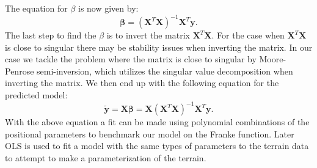 \documentclass[%
 reprint,
nofootinbib,
 amsmath,amssymb,
 aps,
]{revtex4-2}
\begin{document}
%
The equation for $\beta$ is now given by:
%
\begin{equation}\label{eq:beta}
    \boldsymbol{\beta} = (\boldsymbol{X}^{T}\boldsymbol{X})^{-1}\boldsymbol{X}^{T}\boldsymbol{y}.
\end{equation}
%
The last step to find the $\beta$ is to invert the matrix $\boldsymbol{X}^T\boldsymbol{X}$. For the case when $\boldsymbol{X}^T\boldsymbol{X}$ is close to singular there may be stability issues when inverting the matrix. In our case we tackle the problem where the matrix is close to singular by Moore-Penrose semi-inversion, which utilizes the singular value decomposition when inverting the matrix. We then end up with the following equation for the predicted model:
%
\begin{equation*}\label{eq:OLS}
    \boldsymbol{\tilde{y}} = \boldsymbol{X}\boldsymbol{\beta} = \boldsymbol{X}(\boldsymbol{X}^{T}\boldsymbol{X})^{-1}\boldsymbol{X}^{T}\boldsymbol{y}.
\end{equation*}
%
With the above equation a fit can be made using polynomial combinations of the positional parameters to benchmark our model on the Franke function. Later OLS is used to fit a model with the same types of parameters to the terrain data to attempt to make a parameterization of the terrain.
\end{document}
